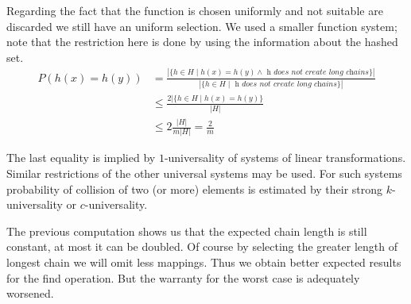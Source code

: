 Regarding the fact that the function is chosen uniformly and not suitable are discarded we still have an uniform selection. We used a smaller function system; note that the restriction here is done by using the information about the hashed set.
\begin{displaymath}
\begin{split}
P(h(x) = h(y)) 
	& =  \frac{|\lbrace h \in H \mid h(x) = h(y) \wedge \textit{ h does not create long chains} \rbrace |}{|\lbrace h \in H \mid \textit{ h does not create long chains} \rbrace|} \\
	& \leq \frac{2 |\lbrace h \in H \mid h(x) = h(y) \rbrace}{|H|} \\
	& \leq 2 \frac{|H|}{m |H|} = \frac{2}{m}
\end{split}
\end{displaymath}

The last equality is implied by $1$-universality of systems of linear transformations. Similar restrictions of the other universal systems may be used. For such systems probability of collision of two (or more) elements is estimated by their strong $k$-universality or $c$-universality.

The previous computation shows us that the expected chain length is still constant, at most it can be doubled. Of course by selecting the greater length of longest chain we will omit less mappings. Thus we obtain better expected results for the find operation. But the warranty for the worst case is adequately worsened.
